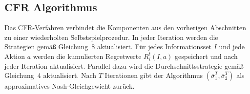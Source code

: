 \subsection{CFR Algorithmus}

Das CFR-Verfahren verbindet die Komponenten aus den vorherigen Abschnitten zu einer wiederholten Selbstspielprozedur.
In jeder Iteration werden die Strategien gemäß Gleichung~8 aktualisiert.
Für jedes Informationsset $I$ und jede Aktion $a$ werden die kumulierten Regretwerte $R_i^t(I,a)$ gespeichert und nach jeder Iteration aktualisiert.
Parallel dazu wird die Durchschnittsstrategie gemäß Gleichung~4 aktualisiert.
Nach $T$ Iterationen gibt der Algorithmus $(\bar\sigma_1^T, \bar\sigma_2^T)$ als approximatives Nash-Gleichgewicht zurück.

